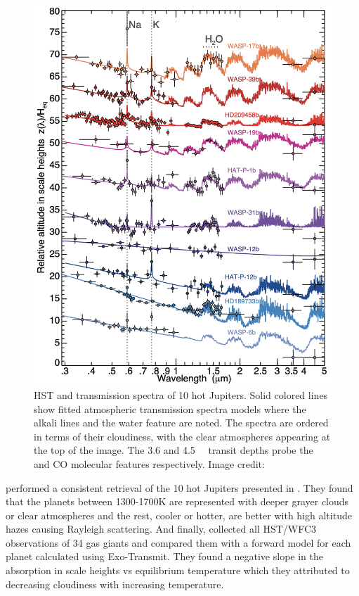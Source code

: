 \begin{figure}
    \centering
    \includegraphics[width = \linewidth]{singetal.png}
    \caption{HST and \spitzer transmission spectra of 10 hot Jupiters. Solid colored lines show fitted atmospheric transmission spectra models where the alkali lines and the water feature are noted. The spectra are ordered in terms of their cloudiness, with the clear atmospheres appearing at the top of the image. The 3.6 and 4.5~\um~ \spitzerIRAC transit depths probe the  and CO molecular features respectively. Image credit: \citet{Sing2016}}
    \label{int:fig:singetal}
\end{figure}

\citet{Barstow2017} performed a consistent retrieval of the 10 hot Jupiters presented in \citet{Sing2016}. They found that the planets between 1300-1700K are represented with deeper grayer clouds or clear atmospheres and the rest, cooler or hotter, are better with high altitude hazes causing Rayleigh scattering. And finally, \citet{Fu2017} collected all HST/WFC3 observations of 34 gas giants and compared them with a forward model for each planet calculated using Exo-Transmit. They found a negative slope in the absorption in scale heights vs equilibrium temperature which they attributed to decreasing cloudiness with increasing temperature.

